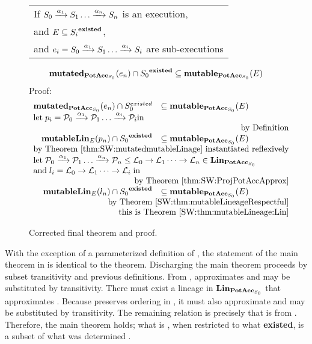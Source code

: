 \begin{figure}
  \begin{tabular}{l}
    If \(S_0 \xrightarrow {\alpha_1} S_1 \dots \xrightarrow {\alpha_{n}} S_{n}\) is an execution,\\
    and \(E \subseteq {S_i}^{\mathbf{existed}}\),\\
    and \( e_i = S_0 \xrightarrow {\alpha_1} S_1 \dots \xrightarrow {\alpha_{i}} S_{i}\) are sub-executions
    \end{tabular}
  \[
  \mathbf{mutated}_{\mathbf{PotAcc}_{S_0}}(e_n) \cap {S_0}^{\mathbf{existed}} \subseteq \mathbf{mutable}_{\mathbf{PotAcc}_{S_0}}(E)
  \]
  Proof:
  \[
  \begin{array}{rl}
    \mutatedapp{\potacc{S_0}}{e_n} \cap S_0^{existed} & \subseteq \mutableapp{\potacc{S_0}}{E} \\
    \multicolumn{2}{l}{\textnormal{let} \; p_i = \multiop{\AccessSeq{P}}{i} \textnormal{in}} \\
    \multicolumn{2}{r}{\textnormal{by Definition}} \\
    \mutableLineageApp{E}{p_n} \cap \existedset{S_0} & \subseteq \mutableapp{\potacc{S_0}}{E} \\
    \multicolumn{2}{r}{\textnormal{by Theorem \ref{thm:SW:mutatedmutableLinage} instantiated reflexively}} \\
    \multicolumn{2}{l}{\textnormal{let} \; \multiop{\AccessSeq{P}}{n} \rightsleq \multiopfree{\AccessSeq{L}}{n} \in \lineage{\potacc{S_0}}} \\
    \multicolumn{2}{l}{\textnormal{and} \; l_i = \multiopfree{\AccessSeq{L}}{i} \; \textnormal{in}} \\
    \multicolumn{2}{r}{\textnormal{by Theorem \ref{thm:SW:ProjPotAccApprox}}} \\
    \mutableLineageApp{E}{l_n} \cap \existedset{S_0} & \subseteq \mutableapp{\potacc{S_0}}{E} \\
    \multicolumn{2}{r}{\textnormal{by Theorem \ref{SW:thm:mutableLineageRespectful}}} \\
    \multicolumn{2}{r}{\textnormal{this is Theorem \ref{SW:thm:mutableLineage:Lin}}}
  \end{array}
  \]
  \caption{Corrected final theorem and proof. \label{SW:thm:correctedMain}}
\end{figure}

With the exception of a parameterized definition of \mutable{}, the statement of the main theorem in  is identical to the \TMSW{} theorem.
Discharging the main theorem proceeds by subset transitivity and previous definitions.
From , \mutableLineage{} approximates \mutated{} and may be substituted by transitivity.
There must exist a lineage in \(\mathbf{Lin}_{\mathbf{PotAcc}_{S_0}}\) that approximates \potacc{}.
Because \mutableLineage{} preserves ordering in , it must also approximate \potacc{} and may be substituted by transitivity.
The remaining relation is precisely that \mutableLineage{} is \mutable{} from .
Therefore, the main theorem holds; what is \mutated{}, when restricted to what {\bf existed}, is a subset of what was determined \mutable{}.

